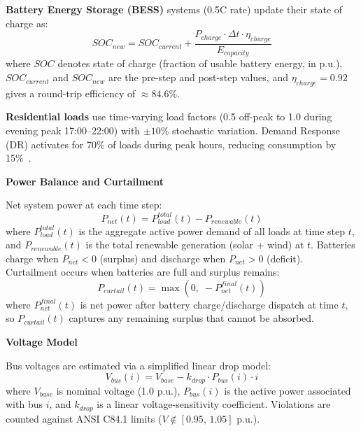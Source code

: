 \textbf{Battery Energy Storage (BESS)} systems (0.5C rate) update their state of charge as:
\begin{equation}
SOC_{new} = SOC_{current} + \frac{P_{charge} \cdot \Delta t \cdot \eta_{charge}}{E_{capacity}}
\label{eq:soc_charge}
\end{equation}
where $SOC$ denotes state of charge (fraction of usable battery energy, in p.u.), $SOC_{current}$ and $SOC_{new}$ are the pre-step and post-step values, and $\eta_{charge} = 0.92$ gives a round-trip efficiency of $\approx 84.6\%$.

\textbf{Residential loads} use time-varying load factors (0.5 off-peak to 1.0 during evening peak 17:00--22:00) with $\pm 10\%$ stochastic variation. Demand Response (DR) activates for 70\% of loads during peak hours, reducing consumption by 15\%~\cite{der_challenges}.

\medskip\noindent\textbf{Power Balance and Curtailment}

Net system power at each time step:
\begin{equation}
P_{net}(t) = P_{load}^{total}(t) - P_{renewable}(t)
\end{equation}
where $P_{load}^{total}(t)$ is the aggregate active power demand of all loads at time step $t$, and $P_{renewable}(t)$ is the total renewable generation (solar + wind) at $t$.
Batteries charge when $P_{net} < 0$ (surplus) and discharge when $P_{net} > 0$ (deficit). Curtailment occurs when batteries are full and surplus remains:
\begin{equation}
P_{curtail}(t) = \max\!\left(0,\; -P_{net}^{final}(t)\right)
\end{equation}
where $P_{net}^{final}(t)$ is net power after battery charge/discharge dispatch at time $t$, so $P_{curtail}(t)$ captures any remaining surplus that cannot be absorbed.

\medskip\noindent\textbf{Voltage Model}

Bus voltages are estimated via a simplified linear drop model:
\begin{equation}
V_{bus}(i) = V_{base} - k_{drop} \cdot P_{bus}(i) \cdot i
\end{equation}
where $V_{base}$ is nominal voltage (1.0 p.u.), $P_{bus}(i)$ is the active power associated with bus $i$, and $k_{drop}$ is a linear voltage-sensitivity coefficient.
Violations are counted against ANSI C84.1 limits ($V \notin [0.95,\, 1.05]$ p.u.).


